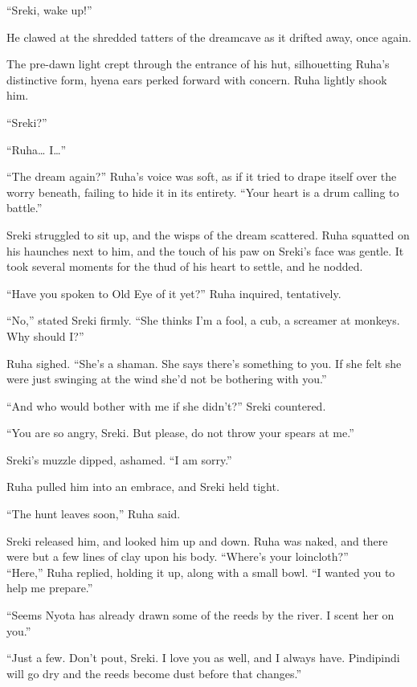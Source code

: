 \secdiv

``Sreki, wake up!''

He clawed at the shredded tatters of the dreamcave as it drifted away, once again.

The pre-dawn light crept through the entrance of his hut, silhouetting Ruha's distinctive form, hyena ears perked forward with concern. Ruha lightly shook him.

``Sreki?''

``Ruha\ldots{} I\ldots''

``The dream again?'' Ruha's voice was soft, as if it tried to drape itself over the worry beneath, failing to hide it in its entirety. ``Your heart is a drum calling to battle.''

Sreki struggled to sit up, and the wisps of the dream scattered. Ruha squatted on his haunches next to him, and the touch of his paw on Sreki's face was gentle. It took several moments for the thud of his heart to settle, and he nodded.

``Have you spoken to Old Eye of it yet?'' Ruha inquired, tentatively.

``No,'' stated Sreki firmly. ``She thinks I'm a fool, a cub, a screamer at monkeys. Why should I?''

Ruha sighed. ``She's a shaman. She says there's something to you. If she felt she were just swinging at the wind she'd not be bothering with you.''

``And who would bother with me if she didn't?'' Sreki countered.

``You are so angry, Sreki. But please, do not throw your spears at me.''

Sreki's muzzle dipped, ashamed. ``I am sorry.''

Ruha pulled him into an embrace, and Sreki held tight.

``The hunt leaves soon,'' Ruha said.

Sreki released him, and looked him up and down. Ruha was naked, and there were but a few lines of clay upon his body. ``Where's your loincloth?''\\
``Here,'' Ruha replied, holding it up, along with a small bowl. ``I wanted you to help me prepare.''

``Seems Nyota has already drawn some of the reeds by the river. I scent her on you.''

``Just a few. Don't pout, Sreki. I love you as well, and I always have. Pindipindi will go dry and the reeds become dust before that changes.''


